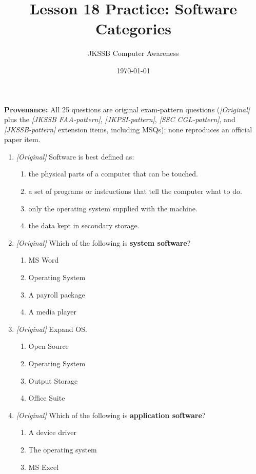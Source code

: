 \documentclass[11pt]{article}
\title{Lesson 18 Practice: Software Categories}
\author{JKSSB Computer Awareness}
\date{\today}
\begin{document}
\maketitle
\noindent\textbf{Provenance:} All 25 questions are original exam-pattern questions (\textit{[Original]} plus the \textit{[JKSSB FAA-pattern]}, \textit{[JKPSI-pattern]}, \textit{[SSC CGL-pattern]}, and \textit{[JKSSB-pattern]} extension items, including MSQs); none reproduces an official paper item.

\begin{enumerate}[label=\textbf{Q\arabic*.}, leftmargin=*]
\item \textit{[Original]} Software is best defined as:
  \begin{enumerate}[label=\Alph*.]
    \item the physical parts of a computer that can be touched.
    \item a set of programs or instructions that tell the computer what to do.
    \item only the operating system supplied with the machine.
    \item the data kept in secondary storage.
  \end{enumerate}
\item \textit{[Original]} Which of the following is \textbf{system software}?
  \begin{enumerate}[label=\Alph*.]
    \item MS Word
    \item Operating System
    \item A payroll package
    \item A media player
  \end{enumerate}
\item \textit{[Original]} Expand OS.
  \begin{enumerate}[label=\Alph*.]
    \item Open Source
    \item Operating System
    \item Output Storage
    \item Office Suite
  \end{enumerate}
\item \textit{[Original]} Which of the following is \textbf{application
  software}?
  \begin{enumerate}[label=\Alph*.]
    \item A device driver
    \item The operating system
    \item MS Excel

\end{enumerate}
\end{enumerate}
\end{document}
